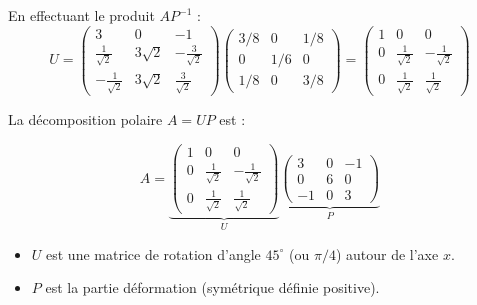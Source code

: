 \documentclass[french]{yLectureNote}
\begin{document}
En effectuant le produit $AP^{-1}$ :
$$U = \begin{pmatrix} 3 & 0 & -1 \\ \frac{1}{\sqrt{2}} & 3\sqrt{2} & -\frac{3}{\sqrt{2}} \\ -\frac{1}{\sqrt{2}} & 3\sqrt{2} & \frac{3}{\sqrt{2}} \end{pmatrix} \begin{pmatrix} 3/8 & 0 & 1/8 \\ 0 & 1/6 & 0 \\ 1/8 & 0 & 3/8 \end{pmatrix} = \begin{pmatrix} 1 & 0 & 0 \\ 0 & \frac{1}{\sqrt{2}} & -\frac{1}{\sqrt{2}} \\ 0 & \frac{1}{\sqrt{2}} & \frac{1}{\sqrt{2}} \end{pmatrix}$$


La décomposition polaire $A = UP$ est :

$$A = \underbrace{\begin{pmatrix} 1 & 0 & 0 \\ 0 & \frac{1}{\sqrt{2}} & -\frac{1}{\sqrt{2}} \\ 0 & \frac{1}{\sqrt{2}} & \frac{1}{\sqrt{2}} \end{pmatrix}}_{U} \underbrace{\begin{pmatrix} 3 & 0 & -1 \\ 0 & 6 & 0 \\ -1 & 0 & 3 \end{pmatrix}}_{P}$$
\begin{itemize}
    \item  $U$ est une matrice de rotation d'angle $45^\circ$ (ou $\pi/4$) autour de l'axe $x$.
    \item $P$ est la partie déformation (symétrique définie positive).
\end{itemize}
\end{document}
